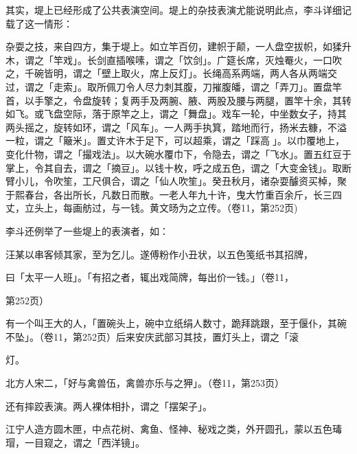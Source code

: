 其实，堤上已经形成了公共表演空间。堤上的杂技表演尤能说明此点，李斗详细记载了这一情形：

\begin{BookQuote}
杂耍之技，来自四方，集于堤上。如立竿百仞，建帜于颠，一人盘空拔帜，如猱升木，谓之「竿戏」。长剑直插喉嗉，谓之「饮剑」。广筵长席，灭烛罨火，一口吹之，千碗皆明，谓之「壁上取火，席上反灯」。长绳高系两端，两人各从两端交过，谓之「走索」。取所佩刀令人尽力刺其腹，刀摧腹皤，谓之「弄刀」。置盘竿首，以手擎之，令盘旋转；复两手及两腕、腋、两股及腰与两腿，置竿十余，其转如飞。或飞盘空际，落于原竿之上，谓之「舞盘」。戏车一轮，中坐数女子，持其两头摇之，旋转如环，谓之「风车」。一人两手执箕，踏地而行，扬米去糠，不溢一粒，谓之「簸米」。置丈许木于足下，可以超乘，谓之「踩高𫏋」。以巾覆地上，变化什物，谓之「撮戏法」。以大碗水覆巾下，令隐去，谓之「飞水」。置五红豆于掌上，令其自去，谓之「摘豆」。以钱十枚，呼之成五色，谓之「大变金钱」。取断臂小儿，令吹笙，工尺俱合，谓之「仙人吹笙」。癸丑秋月，诸杂耍醵资买棹，聚于熙春台，各出所长，凡数日而散。一老人年九十许，曳大竹重百余斤，长三四丈，立头上，每画舫过，与一钱。黄文旸为之立传。（卷11，第252页)
\end{BookQuote}

李斗还例举了一些堤上的表演者，如：

\begin{BookQuote}
汪某以串客倾其家，至为乞儿。遂傅粉作小丑状，以五色笺纸书其招牌，
\end{BookQuote}


\begin{BookQuote}
曰「太平一人班」。「有招之者，辄出戏简牌，每出价一钱。」（卷11，
\end{BookQuote}

第252页）

\begin{BookQuote}
有一个叫王大的人，「置碗头上，碗中立纸绢人数寸，跪拜跳跟，至于偃仆，其碗不坠」。（卷11，第252页）后来安庆武部习其技，置灯头上，谓之「滚
\end{BookQuote}

灯。

\begin{BookQuote}
北方人宋二，「好与禽兽伍，禽兽亦乐与之狎」。（卷11，第253页）
\end{BookQuote}

还有摔跤表演。两人裸体相扑，谓之「摆架子」。

江宁人造方圆木匣，中点花树、禽鱼、怪神、秘戏之类，外开圆孔，蒙以五色瑇瑁，一目窥之，谓之「西洋镜」。

